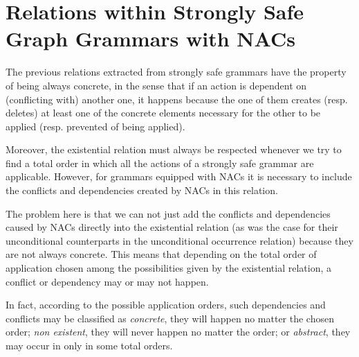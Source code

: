 \section{Relations within Strongly Safe Graph Grammars with NACs}

The previous relations extracted from strongly safe grammars have the property of being always concrete, in the sense that if an action is dependent on (conflicting with) another one, it happens because the one of them creates (resp. deletes) at least one of the concrete elements necessary for the other to be applied (resp. prevented of being applied).

Moreover, the existential relation must always be respected whenever we try to find a total order in which all the actions of a strongly safe grammar are applicable. However, for grammars equipped with NACs it is necessary to include the conflicts and dependencies created by NACs in this relation.

The problem here is that we can not just add the conflicts and dependencies caused by NACs directly into the existential relation (as was the case for their unconditional counterparts in the unconditional occurrence relation) because they are not always concrete. This means that depending on the total order of application chosen among the possibilities given by the existential relation, a conflict or dependency may or may not happen.

In fact, according to the possible application orders, such dependencies and conflicts may be classified as \emph{concrete}, they will happen no matter the chosen order; \emph{non existent}, they will never happen no matter the order; or \emph{abstract}, they may occur in only in some total orders.

